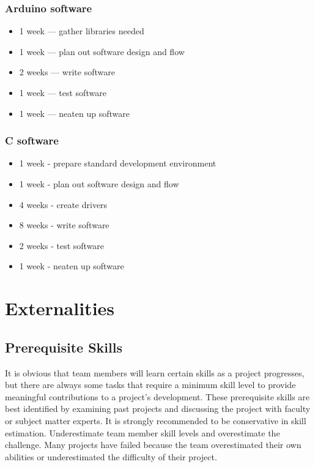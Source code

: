 \documentclass[conference]{IEEEtran} %
\begin{document}
\subsubsection*{Arduino software}
\begin{itemize}
    \item 1 week --- gather libraries needed
    \item 1 week --- plan out software design and flow
    \item 2 weeks --- write software
    \item 1 week --- test software
    \item 1 week --- neaten up software
\end{itemize}

\subsubsection*{C software}
\begin{itemize}
    \item 1 week - prepare standard development environment
    \item 1 week - plan out software design and flow
    \item 4 weeks - create drivers
    \item 8 weeks - write software
    \item 2 weeks - test software
    \item 1 week - neaten up software
\end{itemize}
\section{Externalities}
\subsection{Prerequisite Skills}
It is obvious that team members will learn certain skills as a project progresses, but there are always some tasks that require a minimum skill level to provide meaningful contributions to a project's development.
These prerequisite skills are best identified by examining past projects and discussing the project with faculty or subject matter experts.
It is strongly recommended to be conservative in skill estimation.
Underestimate team member skill levels and overestimate the challenge.
Many projects have failed because the team overestimated their own abilities or underestimated the difficulty of their project.
\end{document}
